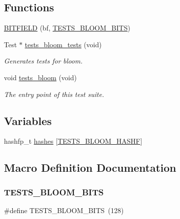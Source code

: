 \subsection*{Functions}
\begin{DoxyCompactItemize}
\item 
\hyperlink{tests-bloom_8c_a99ae9cb3c09344ed152cd11c8b09d8fe}{B\+I\+T\+F\+I\+E\+LD} (bf, \hyperlink{tests-bloom_8c_aac99c3bfab18f44daa9cb459630c15dc}{T\+E\+S\+T\+S\+\_\+\+B\+L\+O\+O\+M\+\_\+\+B\+I\+TS})
\item 
Test $\ast$ \hyperlink{group__unittests_gaaa23c5835dcd15e549fc6bf7227a928e}{tests\+\_\+bloom\+\_\+tests} (void)
\begin{DoxyCompactList}\small\item\em Generates tests for bloom. \end{DoxyCompactList}\item 
void \hyperlink{group__unittests_gabad6e976ec47aecf07c700f947206fdb}{tests\+\_\+bloom} (void)
\begin{DoxyCompactList}\small\item\em The entry point of this test suite. \end{DoxyCompactList}\end{DoxyCompactItemize}
\subsection*{Variables}
\begin{DoxyCompactItemize}
\item 
hashfp\+\_\+t \hyperlink{tests-bloom_8c_a761cf67777e15fbedba279c9441b9cff}{hashes} \mbox{[}\hyperlink{tests-bloom_8c_a301bba6dcc93225ff24b711b215d5f64}{T\+E\+S\+T\+S\+\_\+\+B\+L\+O\+O\+M\+\_\+\+H\+A\+S\+HF}\mbox{]}
\end{DoxyCompactItemize}


\subsection{Macro Definition Documentation}
\mbox{\label{tests-bloom_8c_aac99c3bfab18f44daa9cb459630c15dc}} 
\subsubsection{\texorpdfstring{T\+E\+S\+T\+S\+\_\+\+B\+L\+O\+O\+M\+\_\+\+B\+I\+TS}{TESTS\_BLOOM\_BITS}}
{\footnotesize\ttfamily \#define T\+E\+S\+T\+S\+\_\+\+B\+L\+O\+O\+M\+\_\+\+B\+I\+TS~(128)}

